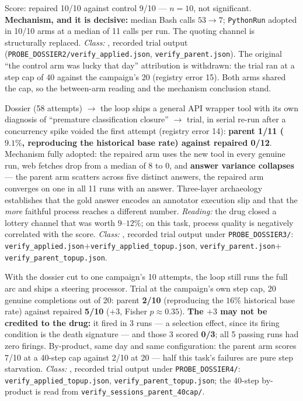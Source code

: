 \begin{description}[leftmargin=0pt,labelindent=0pt,labelsep=0pt,style=nextline,font=\normalfont,itemsep=6pt]
\item[\textbf{F28}\quad Trialling a gate-killed drug, $10 \times 10$.]
Score: repaired 10/10 against control 9/10 --- $n=10$, not significant.
\textbf{Mechanism, and it is decisive:} median Bash calls $53 \to 7$;
\texttt{PythonRun} adopted in 10/10 arms at a median of 11 calls per run.
The quoting channel is structurally replaced. \emph{Class:} ,
recorded trial output (\texttt{PROBE\_DOSSIER2/verify\_applied.json},
\texttt{verify\_parent.json}). The
original ``the control arm was lucky that day'' attribution is withdrawn:
the trial ran at a step cap of 40 against the campaign's 20 (registry
error 15). Both arms shared the cap, so the between-arm reading and the
mechanism conclusion stand.

\item[\textbf{F29}\quad Whole-pipeline re-run on a low-base-rate task.]
Dossier (58 attempts) $\to$ the loop ships a general API wrapper tool with
its own diagnosis of ``premature classification closure'' $\to$ trial, in
serial re-run after a concurrency spike voided the first attempt (registry
error 14): \textbf{parent 1/11 ($9.1\%$, reproducing the historical base
rate) against repaired 0/12}. Mechanism fully adopted: the repaired arm
uses the new tool in every genuine run, web fetches drop from a median of 8
to 0, and \textbf{answer variance collapses} --- the parent arm scatters
across five distinct answers, the repaired arm converges on one in all 11
runs with an answer. Three-layer archaeology establishes that the gold
answer encodes an annotator execution slip and that the \emph{more}
faithful process reaches a different number. \emph{Reading:} the drug
closed a lottery channel that was worth $9$--$12\%$; on this task, process
quality is negatively correlated with the score. \emph{Class:} ,
recorded trial output under \texttt{PROBE\_DOSSIER3/}:
\texttt{verify\_applied.json}$+$\texttt{verify\_applied\_topup.json},
\texttt{verify\_parent.json}$+$\texttt{verify\_parent\_topup.json}.

\item[\textbf{F30}\quad Single-campaign memory, whole pipeline.]
With the dossier cut to one campaign's 10 attempts, the loop still runs the
full arc and ships a steering processor. Trial at the campaign's own step
cap, 20 genuine completions out of 20: parent \textbf{2/10} (reproducing
the $16\%$ historical base rate) against repaired \textbf{5/10}
($+3$, Fisher $p \approx 0.35$). \textbf{The $+3$ may not be credited to
the drug:} it fired in 3 runs --- a selection effect, since its firing
condition is the death signature --- and those 3 scored \textbf{0/3};
all 5 passing runs had zero firings. By-product, same day and same
configuration: the parent arm scores 7/10 at a 40-step cap against 2/10 at
20 --- half this task's failures are pure step starvation.
\emph{Class:} , recorded trial output under
\texttt{PROBE\_DOSSIER4/}: \texttt{verify\_applied\_topup.json},
\texttt{verify\_parent\_topup.json}; the 40-step by-product is read from
\texttt{verify\_sessions\_parent\_40cap/}.


\end{description}

